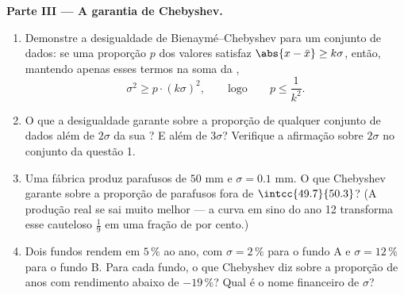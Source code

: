 \begin{problem}
\medskip
\noindent\textbf{Parte III --- A garantia de Chebyshev.}
\begin{enumerate}[resume]
  \item Demonstre a desigualdade de Bienaymé--Chebyshev para um
        conjunto de dados: se uma proporção $p$ dos valores
        satisfaz $\abs{x - \bar x} \geq k\sigma$, então,
        mantendo apenas esses termos na soma da ,
        \[
        \sigma^2 \geq p \cdot (k\sigma)^2,
        \qquad\text{logo}\qquad
        p \leq \frac{1}{k^2} .
        \]
  \item O que a desigualdade garante sobre a proporção de
        qualquer conjunto de dados além de $2\sigma$ da sua
        ? E além de $3\sigma$? Verifique a afirmação sobre
        $2\sigma$ no conjunto da questão 1.
  \item Uma fábrica produz parafusos de  $50$ mm e
        $\sigma = 0.1$ mm. O que Chebyshev garante sobre a
        proporção de parafusos fora de $\intcc{49.7}{50.3}$? (A
        produção real se sai muito melhor --- a curva em sino do
        ano 12 transforma esse cauteloso $\frac19$ em uma fração
        de por cento.)
  \item Dois fundos rendem em  $5\,\%$ ao ano, com
        $\sigma = 2\,\%$ para o fundo A e $\sigma = 12\,\%$ para
        o fundo B. Para cada fundo, o que Chebyshev diz sobre a
        proporção de anos com rendimento abaixo de $-19\,\%$?
        Qual é o nome financeiro de $\sigma$?
\end{enumerate}


\end{problem}
